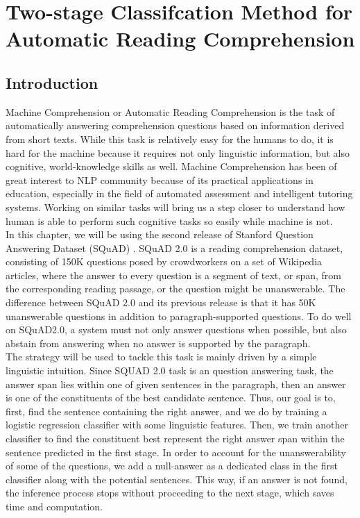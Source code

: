 
\chapter{Two-stage Classifcation Method for Automatic Reading Comprehension } %

\label{Chapter3} %

\section{Introduction}

Machine Comprehension or Automatic Reading Comprehension is the task of automatically answering comprehension questions based on information derived from short texts. While this task is relatively easy for the humans to do, it is hard for the machine because it requires not only linguistic information, but also cognitive, world-knowledge skills as well. Machine Comprehension has been of great interest to NLP community because of its practical applications in education, especially in the field of automated assessment and intelligent tutoring systems. Working on similar tasks will bring us a step closer to understand how human is able to perform such cognitive tasks so easily while machine is not. \\

In this chapter, we will be using the second release of Stanford Question Answering Dataset (SQuAD) \citep{rajpurkar2018know}. SQuAD 2.0 is a reading comprehension dataset, consisting of 150K questions posed by crowdworkers on a set of Wikipedia articles, where the answer to every question is a segment of text, or span, from the corresponding reading passage, or the question might be unanswerable. The difference between SQuAD 2.0 and its previous release is that it has 50K unanswerable questions in addition to paragraph-supported questions.  To do well on SQuAD2.0, a system must not only answer questions when possible, but also abstain from answering when no answer is supported by the paragraph. \\

The strategy will be used to tackle this task is mainly driven by a simple linguistic intuition. Since SQUAD 2.0 task is an  question answering task, the answer span lies within one of given sentences in the paragraph, then an answer is one of the constituents of the best candidate sentence. Thus, our goal is to, first, find the sentence containing the right answer, and we do by training a logistic regression classifier with some linguistic features. Then, we train another classifier to find the constituent best represent the right answer span within the sentence predicted in the first stage. In order to account for the unanswerability of some of the questions, we add a null-answer as a dedicated class in the first classifier along with the potential sentences. This way, if an answer is not found, the inference process stops without proceeding to the next stage, which saves time and computation. 



